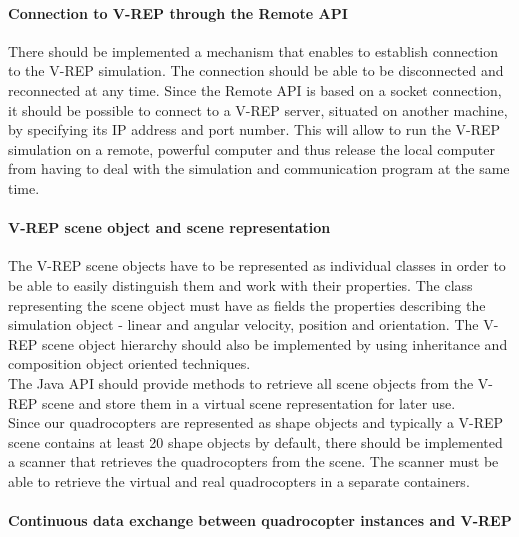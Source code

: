 \paragraph{Connection to V-REP through the Remote API}

There should be implemented a mechanism that enables to establish connection to the V-REP simulation. The connection should be able to be disconnected and reconnected at any time. Since the Remote API is based on a socket connection, it should be possible to connect to a V-REP server, situated on another machine, by specifying its IP address and port number. This will allow to run the V-REP simulation on a remote, powerful computer and thus release the local computer from having to deal with the simulation and communication program at the same time.

\paragraph{V-REP scene object and scene representation}\label{sceneobject}
The V-REP scene objects have to be represented as individual classes in order to be able to easily distinguish them and work with their properties. The class representing the scene object must have as fields the properties describing the simulation object - linear and angular velocity, position and orientation. The V-REP scene object hierarchy should also be implemented by using inheritance and composition object oriented techniques. \\
The Java API should provide methods to retrieve all scene objects from the V-REP scene and store them in a virtual scene representation for later use.\\
Since our quadrocopters are represented as shape objects and typically a V-REP scene contains at least 20 shape objects by default, there should be implemented a scanner that retrieves the quadrocopters from the scene. The scanner must be able to retrieve the virtual and real quadrocopters in a separate containers.

\paragraph{Continuous data exchange between quadrocopter instances and V-REP}

